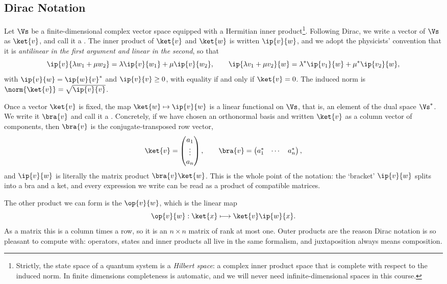 \subsection{Dirac Notation}\label{sec:dirac}

Let $\Vs$ be a finite-dimensional complex vector space equipped with a Hermitian inner product\footnote{Strictly, the state space of a quantum system is a \emph{Hilbert space}: a complex inner product space that is complete with respect to the induced norm. In finite dimensions completeness is automatic, and we will never need infinite-dimensional spaces in this course.}. Following Dirac, we write a vector of $\Vs$ as $\ket{v}$, and call it a . The inner product of $\ket{v}$ and $\ket{w}$ is written $\ip{v}{w}$, and we adopt the physicists' convention that it is \emph{antilinear in the first argument and linear in the second}, so that
$$\ip{v}{\lambda w_1 + \mu w_2} = \lambda\ip{v}{w_1} + \mu \ip{v}{w_2}, \qquad \ip{\lambda v_1 + \mu v_2}{w} = \lambda^*\ip{v_1}{w} + \mu^*\ip{v_2}{w},$$
with $\ip{v}{w} = \ip{w}{v}^*$ and $\ip{v}{v} \geq 0$, with equality if and only if $\ket{v} = 0$. The induced norm is $\norm{\ket{v}} = \sqrt{\ip{v}{v}}$.

Once a vector $\ket{v}$ is fixed, the map $\ket{w} \mapsto \ip{v}{w}$ is a linear functional on $\Vs$, that is, an element of the dual space $\Vs^*$. We write it $\bra{v}$ and call it a . Concretely, if we have chosen an orthonormal basis and written $\ket{v}$ as a column vector of components, then $\bra{v}$ is the conjugate-transposed row vector,
$$\ket{v} = \begin{pmatrix} a_1 \\ \vdots \\ a_n\end{pmatrix}, \qquad \bra{v} = \begin{pmatrix} a_1^* & \cdots & a_n^*\end{pmatrix},$$
and $\ip{v}{w}$ is literally the matrix product $\bra{v}\ket{w}$. This is the whole point of the notation: the `bracket' $\ip{v}{w}$ splits into a bra and a ket, and every expression we write can be read as a product of compatible matrices.

The other product we can form is the  $\op{v}{w}$, which is the linear map
$$\op{v}{w} : \ket{x} \longmapsto \ket{v}\ip{w}{x}.$$
As a matrix this is a column times a row, so it is an $n \times n$ matrix of rank at most one. Outer products are the reason Dirac notation is so pleasant to compute with: operators, states and inner products all live in the same formalism, and juxtaposition always means composition.

